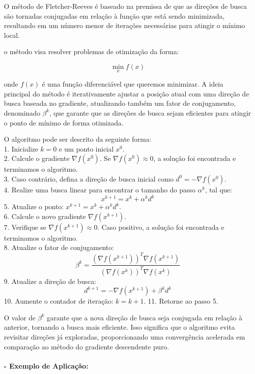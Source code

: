 \documentclass[a4paper, 12pt]{article}
\begin{document}
O método de Fletcher-Reeves é baseado na premissa de que as direções de busca são tornadas conjugadas em relação à função que está sendo minimizada, resultando em um número menor de iterações necessárias para atingir o mínimo local. 


o método visa resolver problemas de otimização da forma:

\[
\min_x f(x)
\]

onde $f(x)$ é uma função diferenciável que queremos minimizar. A ideia principal do método é iterativamente ajustar a posição atual com uma direção de busca baseada no gradiente, atualizando também um fator de conjugamento, denominado $\beta^k$, que garante que as direções de busca sejam eficientes para atingir o ponto de mínimo de forma otimizada.

O algoritmo pode ser descrito da seguinte forma:\\

1. Inicialize $k = 0$ e um ponto inicial $x^0$.\\
2. Calcule o gradiente $\nabla f(x^0)$. Se $\nabla f(x^0) \approx 0$, a solução foi encontrada e terminamos o algoritmo.\\
3. Caso contrário, defina a direção de busca inicial como $d^0 = -\nabla f(x^0)$.\\
4. Realize uma busca linear para encontrar o tamanho do passo $\alpha^k$, tal que:
   \[
x^{k+1} = x^k + \alpha^k d^k
   \]
5. Atualize o ponto: $x^{k+1} = x^k + \alpha^k d^k$.\\
6. Calcule o novo gradiente $\nabla f(x^{k+1})$.\\
7. Verifique se $\nabla f(x^{k+1}) \approx 0$. Caso positivo, a solução foi encontrada e terminamos o algoritmo.\\
8. Atualize o fator de conjugamento:
   \[
   \beta^k = \frac{(\nabla f(x^{k+1}))^T \nabla f(x^{k+1})}{(\nabla f(x^k))^T \nabla f(x^k)}
   \]
9. Atualize a direção de busca:
   \[
   d^{k+1} = -\nabla f(x^{k+1}) + \beta^k d^k
   \]
10. Aumente o contador de iteração: $k = k + 1$.
11. Retorne ao passo 5.

O valor de $\beta^k$ garante que a nova direção de busca seja conjugada em relação à anterior, tornando a busca mais eficiente. Isso significa que o algoritmo evita revisitar direções já exploradas, proporcionando uma convergência acelerada em comparação ao método do gradiente descendente puro.\\\\

\textbf{- Exemplo de Aplicação:}\\
\end{document}
